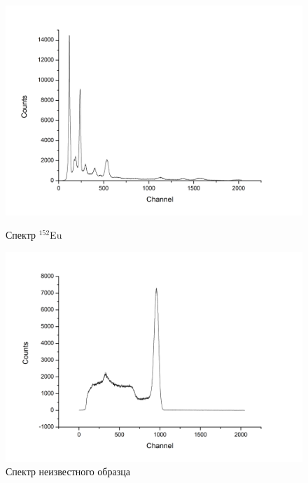 \documentclass[a4paper]{article}
\begin{document}
\begin{enumerate}
        \begin{figure}[h]
\begin{center}
\begin{minipage}[h]{0.48\linewidth}
\includegraphics[width=1\linewidth]{Eu.png}
\caption{Спектр $^{152}$Eu} %
\end{minipage}
\hfill 
\begin{minipage}[h]{0.48\linewidth}
\includegraphics[width=1\linewidth]{Unknown.png}
\caption{Спектр неизвестного образца}
\label{ris:experimcoded}
\end{minipage}
\end{center}
\end{figure}


\end{enumerate}
\end{document}

